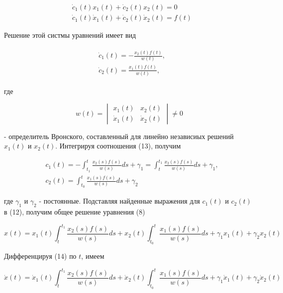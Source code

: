 \documentclass{article}
\theoremstyle{plain} \newtheorem*{theorem*}{Теорема}
\theoremstyle{plain} \newtheorem{theorem}{Теорема}[section]
\theoremstyle{defintition} \newtheorem*{corollary*}{Следствие}
\theoremstyle{remark} \newtheorem*{example*}{Пример}
\theoremstyle{remark} \newtheorem*{remark*}{Замечание}
\begin{document}
\begin{align*}
    & \dot{c}_1(t) x_1(t) + \dot{c}_2(t) x_2(t) = 0 \\
    & \dot{c}_1(t) \dot{x}_1(t) + \dot{c}_2(t) \dot{x}_2(t) = f(t)
\end{align*}

Решение этой систмы уравнений имеет вид

\begin{gather}
    \begin{split}
        & \dot{c}_1(t) = - \frac{x_2(t)f(t)}{w(t)}, \\
        & \dot{c}_2(t) = \frac{x_1(t)f(t)}{w(t)},
    \end{split}
\end{gather}

где

\begin{equation*}
    w(t) =
    \begin{vmatrix}
        x_1(t) & x_2(t) \\
        \dot{x}_1(t) & \dot{x}_2(t)
    \end{vmatrix}
    \ne 0
\end{equation*}

- определитель Вронского, составленный для линейно
независиых решений $x_1(t)$ и $x_2(t)$. Интегрируя
соотношения (13), получим

\begin{align*}
    & c_1(t) = - \int^t_{t_1} \frac{x_2(s)f(s)}{w(s)} ds + \gamma_1
    = \int^{t_1}_t \frac{x_2(s)f(s)}{w(s)} ds + \gamma_1, \\
    & c_2(t) = \int^t_{t_0} \frac{x_1(s)f(s)}{w(s)} ds + \gamma_2
\end{align*}

где $\gamma_1$ и $\gamma_2$ - постоянные.
Подставляя найденные выражения для $c_1(t)$ и $c_2(t)$ в (12),
получим общее решение уравнения (8)

\begin{equation}
    x(t) =
    x_1(t)\int^{t_1}_t \frac{x_2(s)f(s)}{w(s)} ds +
    x_2(t)\int^t_{t_0} \frac{x_1(s)f(s)}{w(s)} ds
    + \gamma_1 x_1(t)
    + \gamma_2 x_2(t)
\end{equation}

Дифференцируя (14) по $t$, имеем

\begin{equation}
    \dot{x}(t) =
    \dot{x}_1(t)\int^{t_1}_t \frac{x_2(s)f(s)}{w(s)} ds +
    \dot{x}_2(t)\int^t_{t_0} \frac{x_1(s)f(s)}{w(s)} ds
    + \gamma_1 \dot{x}_1(t)
    + \gamma_2 \dot{x}_2(t)
\end{equation}
\end{document}

